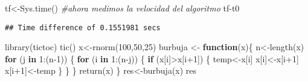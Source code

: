 \documentclass[]{elsarticle} %
\newenvironment{Shaded}{\begin{snugshade}}{\end{snugshade}}
\newcommand{\CommentTok}[1]{\textcolor[rgb]{0.56,0.35,0.01}{\textit{#1}}}
\newcommand{\ControlFlowTok}[1]{\textcolor[rgb]{0.13,0.29,0.53}{\textbf{#1}}}
\newcommand{\DecValTok}[1]{\textcolor[rgb]{0.00,0.00,0.81}{#1}}
\newcommand{\FunctionTok}[1]{\textcolor[rgb]{0.00,0.00,0.00}{#1}}
\newcommand{\NormalTok}[1]{#1}
\newcommand{\OtherTok}[1]{\textcolor[rgb]{0.56,0.35,0.01}{#1}}
\newcommand{\SpecialCharTok}[1]{\textcolor[rgb]{0.00,0.00,0.00}{#1}}
\begin{document}
\begin{Shaded}
\begin{Highlighting}[]
\NormalTok{tf}\OtherTok{\textless{}{-}}\FunctionTok{Sys.time}\NormalTok{()}
\CommentTok{\#ahora medimos la velocidad del algoritmo}
\NormalTok{tf}\SpecialCharTok{{-}}\NormalTok{t0}
\end{Highlighting}
\end{Shaded}

\begin{verbatim}
## Time difference of 0.1551981 secs
\end{verbatim}

\begin{Shaded}
\begin{Highlighting}[]
\FunctionTok{library}\NormalTok{(tictoc)}
\FunctionTok{tic}\NormalTok{()}
\NormalTok{x}\OtherTok{\textless{}{-}}\FunctionTok{rnorm}\NormalTok{(}\DecValTok{100}\NormalTok{,}\DecValTok{50}\NormalTok{,}\DecValTok{25}\NormalTok{)}
\NormalTok{burbuja }\OtherTok{\textless{}{-}} \ControlFlowTok{function}\NormalTok{(x)\{}
\NormalTok{  n}\OtherTok{\textless{}{-}}\FunctionTok{length}\NormalTok{(x)}
  \ControlFlowTok{for}\NormalTok{ (j }\ControlFlowTok{in} \DecValTok{1}\SpecialCharTok{:}\NormalTok{(n}\DecValTok{{-}1}\NormalTok{)) \{}
    \ControlFlowTok{for}\NormalTok{ (i }\ControlFlowTok{in} \DecValTok{1}\SpecialCharTok{:}\NormalTok{(n}\SpecialCharTok{{-}}\NormalTok{j)) \{}
      \ControlFlowTok{if}\NormalTok{ (x[i]}\SpecialCharTok{\textgreater{}}\NormalTok{x[i}\SpecialCharTok{+}\DecValTok{1}\NormalTok{]) \{}
\NormalTok{        temp}\OtherTok{\textless{}{-}}\NormalTok{x[i]}
\NormalTok{        x[i]}\OtherTok{\textless{}{-}}\NormalTok{x[i}\SpecialCharTok{+}\DecValTok{1}\NormalTok{]}
\NormalTok{        x[i}\SpecialCharTok{+}\DecValTok{1}\NormalTok{]}\OtherTok{\textless{}{-}}\NormalTok{temp}
\NormalTok{      \}}
\NormalTok{    \}}
\NormalTok{  \}}
  \FunctionTok{return}\NormalTok{(x)}
\NormalTok{\}}
\NormalTok{res}\OtherTok{\textless{}{-}}\FunctionTok{burbuja}\NormalTok{(x)}
\NormalTok{res}
\end{Highlighting}
\end{Shaded}
\end{document}
